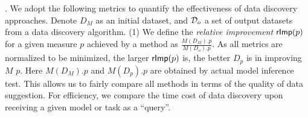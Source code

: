 . 
We adopt the following metrics 
to quantify the effectiveness of data discovery approaches. Denote $D_M$ as an initial dataset, and 
${\mathcal D}_o$ a set of output datasets from 
a data discovery algorithm. 
(1) We define the {\em relative improvement} 
${\mathsf{rImp}}(p)$ for a given 
measure $p$ achieved by a
method as $\frac{M(D_M).p}{M(D_o).p}$.
As all metrics are normalized to be minimized,
the larger ${\mathsf{rImp}}(p)$ is,
the better $D_p$ is in improving $M$ \wrt $p$. 
Here $M(D_M).p$ and $M(D_p).p$ are obtained 
by actual model inference test. 
This allows us to fairly compare all 
methods in terms of the quality of data 
suggestion. 
For efficiency, we compare the time cost of data discovery upon 
receiving a given model or task 
as a ``query''. 




